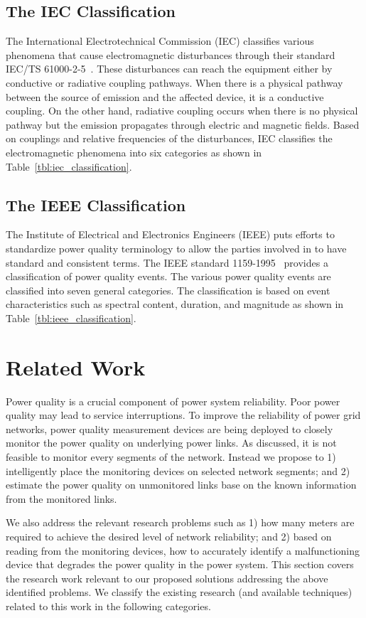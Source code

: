 \subsection{The IEC Classification}
The International Electrotechnical Commission (IEC) classifies various phenomena that cause electromagnetic disturbances through their standard IEC/TS 61000-2-5~\cite{iec_61000}. These disturbances can reach the equipment either by conductive or radiative coupling pathways. When there is a physical pathway between the source of emission and the affected device, it is a conductive coupling. On the other hand, radiative coupling occurs when there is no physical pathway but the emission propagates through electric and magnetic fields. Based on couplings and relative frequencies of the disturbances, IEC classifies the electromagnetic phenomena into six categories as shown in Table~\ref{tbl:iec_classification}.

\subsection{The IEEE Classification}
The Institute of Electrical and Electronics Engineers (IEEE) puts efforts to standardize power quality terminology to allow the parties involved in to have standard and consistent terms. The IEEE standard 1159-1995~\cite{IEEE09_1159} provides a classification of power quality events. The various power quality events are classified into seven general categories. The classification is based on event characteristics such as spectral content, duration, and magnitude as shown in Table~\ref{tbl:ieee_classification}.

\section{Related Work}
\label{sec:related_work}
Power quality is a crucial component of power system reliability. Poor power quality may lead to service interruptions. To improve the reliability of power grid networks, power quality measurement devices are being deployed to closely monitor the  power quality on underlying power links. As discussed, it is not feasible to monitor every segments of the network. Instead we propose to 1) intelligently place the monitoring devices on selected network segments; and 2) estimate the power quality on unmonitored links base on the known information from the monitored links.

We also address the relevant research problems such as 1) how many meters are required to achieve the desired level of network reliability; and 2) based on reading from the monitoring devices, how to accurately identify a malfunctioning device that degrades the power quality in the power system. This section covers the research work relevant to our proposed solutions addressing the above identified problems. We classify the existing research (and available techniques) related to this work in the following categories.

